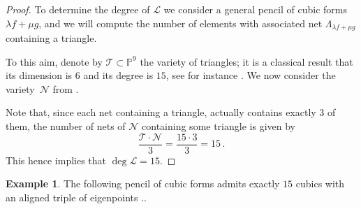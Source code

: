 \documentclass{amsart}
\theoremstyle{plain}
\theoremstyle{definition}
\newtheorem{es}[lemma]{Example}
\newcommand{\p}{\mathbb{P}}
\newcommand{\comment}[1]{}
\begin{document}
{\begin{proof}
To determine the degree of $\mathcal L$ we consider a general pencil of cubic forms $\lambda f + \mu g$, and we will compute the number of elements with associated net $\Lambda_{\lambda f + \mu g}$ containing a triangle.

To this aim, denote by ${\mathcal T} \subset \p^9$ the variety of triangles; it is a classical result that its dimension is $6$ and its degree is $15$,
see for instance \cite[Section 2.2.2]{3264}. We now consider the variety~${\mathcal N}$ from .
\comment{
given by the union of the nets of cubics of the pencil
\[
{\mathcal N} = \bigcup_{(\lambda : \mu) \in \p^1} \Lambda_{\lambda f + \mu g} \subset \p^9.
\]
Observe that we can assume that ${\mathcal N}$ is an embedding of a rational projective bundle; indeed, it can be seen as an immersion of the $\p^2$-bundle over $\p^1$ given by the family the planes ${\mathcal P}=
\{\Lambda_{\lambda f + \mu g}\ : \ (\lambda:\mu)\in \p^1\} \subset \p^1 \times \p^9$. The map ${\mathcal P} \to {\mathcal N}$ contracts no subvariety of any plane of ${\mathcal P}$, so it is either an embedding or it contracts some horizontal curve. In the latter case, all the planes of the family should intersect in at least one point. In particular, the two nets $\Lambda_f$ and $\Lambda_g$ should have non-empty intersection.
If we denote by $M_1$, $M_2$ and $M_3$ the $2 \times 2$ minors relative to $F$, and by $N_1$, $N_2$ and $N_3$ the ones relative to $g$, the vectorial dimension of the linear span
$\langle M_1,M_2,M_3,N_1,N_2,N_3
\rangle$ should be strictly less than $6$. This can be avoided, since such a condition corresponds to a proper closed subscheme of $\p^9 \times \p^9$.

It follows that if ${\mathcal N}$ is general enough, it is a $3$-dimensional rational normal scroll in
$$
{\mathcal N}\subset \p(\langle M_1,M_2,M_3,N_1,N_2,N_3
\rangle) \cong \p^5,
$$
and being a variety of minimal degree, its degree is $\deg {\mathcal N}=5+1-3=3$.
}
Note that, since each net containing a triangle, actually contains exactly $3$ of them, the number of nets of ${\mathcal N}$ containing some triangle is given by
%
\[
\frac {{\mathcal T} \cdot {\mathcal N}}{3} =\frac{{15} \cdot {3}}{3}=15 \,.
\]
%
This hence implies that $\deg {\mathcal L} = 15$.
\end{proof}

\begin{es}
The following pencil of cubic forms admits exactly $15$ cubics with an aligned triple of eigenpoints ..
\end{es}

}
\end{document}
